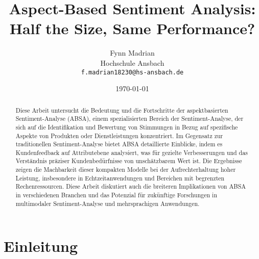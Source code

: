 \documentclass[12pt]{article}
\title{Aspect-Based Sentiment Analysis: Half the Size, Same Performance?}
\author{Fynn Madrian \\ Hochschule Ansbach \\ \texttt{f.madrian18230@hs-ansbach.de}}
\date{\today}
\begin{document}
\maketitle

\begin{abstract}
Diese Arbeit untersucht die Bedeutung und die Fortschritte der aspektbasierten Sentiment-Analyse (ABSA), einem spezialisierten Bereich der 
Sentiment-Analyse, der sich auf die Identifikation und Bewertung von Stimmungen in Bezug auf spezifische Aspekte von Produkten oder Dienstleistungen 
konzentriert. Im Gegensatz zur traditionellen Sentiment-Analyse bietet ABSA detaillierte Einblicke, indem es Kundenfeedback auf Attributebene 
analysiert, was für gezielte Verbesserungen und das Verständnis präziser Kundenbedürfnisse von unschätzbarem Wert ist. 
Die Ergebnisse zeigen die Machbarkeit dieser kompakten Modelle bei der Aufrechterhaltung hoher Leistung, insbesondere 
in Echtzeitanwendungen und Bereichen mit begrenzten Rechenressourcen. Diese Arbeit diskutiert auch die breiteren Implikationen 
von ABSA in verschiedenen Branchen und das Potenzial für zukünftige Forschungen in multimodaler Sentiment-Analyse und mehrsprachigen 
Anwendungen.\end{abstract}

\newpage


\tableofcontents
\renewcommand{\contentsname}{Inhaltsverzeichnis}
\setcounter{tocdepth}{4}


\newpage 



\section{Einleitung}
\end{document}
